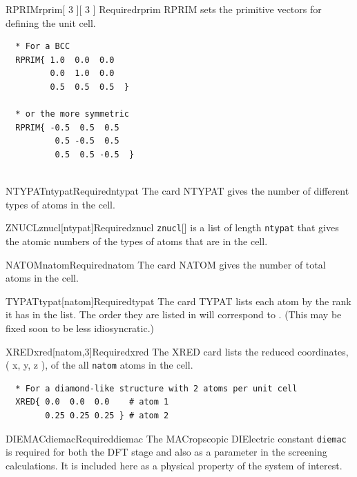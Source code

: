 \documentclass[11pt]{report}
\begin{document}
\begin{Card}{RPRIM}{rprim[ 3 ][ 3 ] }{Required}{rprim}
  RPRIM sets the primitive vectors for defining the unit cell. 
  
  \begin{verbatim}
  * For a BCC
  RPRIM{ 1.0  0.0  0.0
         0.0  1.0  0.0
         0.5  0.5  0.5  }
  
  * or the more symmetric
  RPRIM{ -0.5  0.5  0.5
          0.5 -0.5  0.5
          0.5  0.5 -0.5  }
         
  \end{verbatim}
\end{Card}

\begin{Card}{NTYPAT}{ntypat}{Required}{ntypat}
The card NTYPAT gives the number of different types of atoms in the cell. 
\end{Card}

\begin{Card}{ZNUCL}{znucl[ntypat]}{Required}{znucl}
\texttt{znucl}[] is a list of length \texttt{ntypat} that gives the atomic numbers of the types of atoms that are in the cell.
\end{Card}

\begin{Card}{NATOM}{natom}{Required}{natom}
The card NATOM gives the number of total atoms in the cell.
\end{Card}

\begin{Card}{TYPAT}{typat[natom]}{Required}{typat}
The card TYPAT lists each atom by the rank it has in the  list. The order they are listed in will correspond to . (This may be fixed soon to be less idiosyncratic.)
\end{Card}

\begin{Card}{XRED}{xred[natom,3]}{Required}{xred}
The XRED card lists the reduced coordinates, ( x, y, z ), of the all \texttt{natom} atoms in the cell.
  \begin{verbatim}
  * For a diamond-like structure with 2 atoms per unit cell
  XRED{ 0.0  0.0  0.0    # atom 1
        0.25 0.25 0.25 } # atom 2
  \end{verbatim}
\end{Card}

\begin{Card}{DIEMAC}{diemac}{Required}{diemac}
The MACropscopic DIElectric constant \texttt{diemac} is required for both the DFT stage and also as a parameter in the screening calculations. It is included here as a physical property of the system of interest.
\end{Card}
\end{document}
